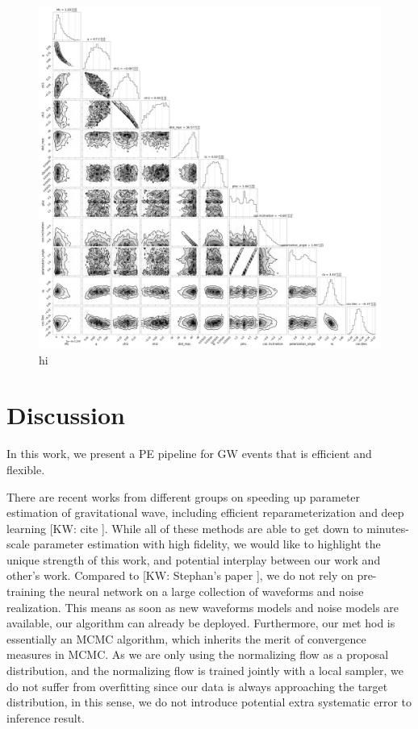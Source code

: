 \documentclass[twocolumn]{aastex631}
\newcommand{\kw}[1]{{\color{rb4}[KW: #1 ]}}
\begin{document}
\begin{figure}
\includegraphics[width=0.99\linewidth]{static/GW170817.png}
\caption{
    hi
}
\label{fig:GW170817}
\end{figure}


\section{Discussion}
\label{sec: Discussion}

In this work, we present a PE pipeline for GW events that is efficient and flexible.


There are recent works from different groups on speeding up parameter estimation
of gravitational wave, including efficient reparameterization and deep learning
\kw{cite}. While all of these methods are able to get down to minutes-scale parameter
estimation with high fidelity, we would like to highlight the unique strength of
this work, and potential interplay between our work and other's work.
Compared to \kw{Stephan's paper}, we do not rely on pre-training the
neural network on a large collection of waveforms and noise realization. This
means as soon as new waveforms models and noise models are available, our
algorithm can already be deployed. Furthermore, our met hod is essentially an
MCMC algorithm, which inherits the merit of convergence measures in MCMC. As we
are only using the normalizing flow as a proposal distribution, and the
normalizing flow is trained jointly with a local sampler, we do not suffer from
overfitting since our data is always approaching the target distribution, in
this sense, we do not introduce potential extra systematic error to inference
result.
\end{document}
